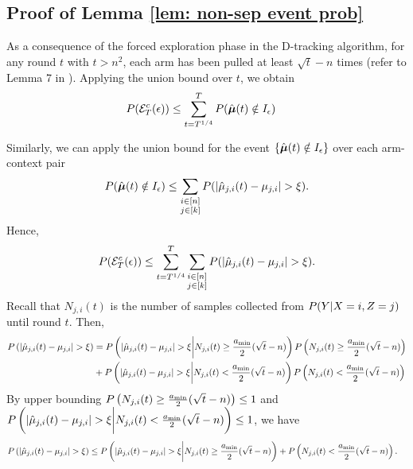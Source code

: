     \subsection{Proof of Lemma \ref{lem: non-sep event prob}} \label{apd: proof-non-sep event prob}
        As a consequence of the forced exploration phase in the D-tracking algorithm, for any round $t$ with $t > n^2$, each arm has been pulled at least $\sqrt{t} - n$ times (refer to Lemma 7 in \cite{track-stop-garivier2016optimal}). Applying the union bound over $t$, we obtain
        \begin{align*}
            P(\mathcal{E}_T^c(\epsilon)) &\leq \sum_{t = T^{1/4}}^T P(\hat{\boldsymbol{\mu}}(t) \notin I_{\epsilon})
        \end{align*}

        Similarly, we can apply the union bound for the event $\{\hat{\boldsymbol{\mu}}(t) \notin I_{\epsilon}\}$ over each arm-context pair
       \begin{align*}
             P(\hat{\boldsymbol{\mu}}(t) \notin I_{\epsilon}) \leq \sum_{\substack{i \in [n] \\ j \in [k]}} P(\vert \hat{\mu}_{j,i}(t) - \mu_{j,i} \vert > \xi).
       \end{align*}
       Hence,
        \begin{align*}
            P(\mathcal{E}^c_T(\epsilon)) \leq \sum_{t = T^{1/4}}^T \sum_{\substack{i \in [n] \\ j \in [k]}} P(|\hat{\mu}_{j,i}(t) - \mu_{j,i}| > \xi).
        \end{align*}
        Recall that $N_{j,i}(t)$ is the number of samples collected from $P(Y|X=i, Z=j)$ until round $t$. Then,
        \begin{align*}
            P \left(\vert \hat{\mu}_{j,i}(t) - \mu_{j,i} \vert > \xi \right) &= P\left(\vert \hat{\mu}_{j,i}(t) - \mu_{j,i} \vert > \xi \bigg| N_{j,i}(t) \geq \frac{a_{\min}}{2} (\sqrt{t} - n) \right)  P\left(N_{j,i}(t) \geq \frac{a_{\min}}{2} (\sqrt{t} - n) \right)\\
            &+  P \left(\vert \hat{\mu}_{j,i}(t) - \mu_{j,i} \vert > \xi \bigg| N_{j,i}(t) < \frac{a_{\min}}{2} (\sqrt{t} - n) \right)  P \left( N_{j,i}(t) < \frac{a_{\min}}{2} (\sqrt{t} - n) \right) 
        \end{align*}    
        By upper bounding $P\left(N_{j,i}(t) \geq \frac{a_{\min}}{2} (\sqrt{t} - n) \right) \leq 1$ and $P \left(\vert \hat{\mu}_{j,i}(t) - \mu_{j,i} \vert > \xi \bigg| N_{j,i}(t) < \frac{a_{\min}}{2} (\sqrt{t} - n) \right) \leq 1$, we have
        \begin{align*}
            & P \left(\vert \hat{\mu}_{j,i}(t) - \mu_{j,i} \vert > \xi \right) \leq P \left( \vert \hat{\mu}_{j,i}(t) - \mu_{j,i} \vert > \xi \bigg| N_{j,i}(t) \geq \frac{a_{\min}}{2} (\sqrt{t} - n) \right) + P \left( N_{j,i}(t) < \frac{a_{\min}}{2} (\sqrt{t} - n) \right).
        \end{align*}
